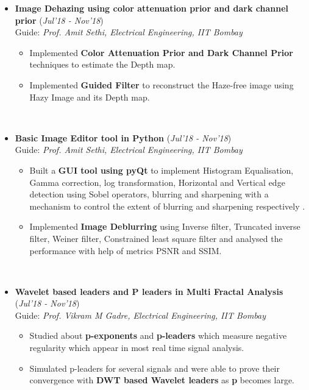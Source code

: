 \documentclass[10pt]{article}
\begin{document}
\begin{itemize}[leftmargin=0.4cm]
	\vspace{-0.25cm}	
	


\item \textbf{Image Dehazing using color attenuation prior and dark channel prior 
} \hfill{(\textit{Jul'18 - Nov'18})}\\
Guide: \textit{Prof. Amit Sethi, Electrical Engineering, IIT Bombay}\\\vspace{-0.68cm}
	\begin{itemize}
	\item Implemented \textbf{Color Attenuation Prior and Dark Channel Prior} techniques to estimate the Depth map.\vspace{-0.1cm}
	\item Implemented \textbf{Guided Filter} to reconstruct the Haze-free image using Hazy Image and its Depth map.\vspace{-0.1cm}
	\end{itemize}\
\vspace{-0.75cm}	

\item \textbf{Basic Image Editor tool in Python 
} 
\hfill{(\textit{Jul'18 - Nov'18})}\\
Guide: \textit{Prof. Amit Sethi, Electrical Engineering, IIT Bombay}\\\vspace{-0.68cm}
	\begin{itemize}
	\item Built a \textbf{GUI tool using pyQt} to implement Histogram Equalisation, Gamma correction, log transformation, Horizontal and Vertical edge detection using Sobel operators, blurring and sharpening with a mechanism to control the extent of blurring and sharpening respectively .\vspace{-0.1cm}
	\item Implemented \textbf{Image Deblurring} using Inverse filter, Truncated inverse filter, Weiner filter, Constrained least square filter and analysed the performance with help of metrics PSNR and SSIM.\vspace{-0.1cm}
	\end{itemize}\
\vspace{-0.75cm}

\item \textbf{Wavelet based leaders and P leaders in Multi
Fractal Analysis} 
\hfill{(\textit{Jul'18 - Nov'18})}\\
Guide: \textit{Prof. Vikram M Gadre, Electrical Engineering, IIT Bombay}\\\vspace{-0.68cm}
	\begin{itemize}
	\item Studied about \textbf{p-exponents} and \textbf{p-leaders} which measure negative regularity which appear in most real time signal analysis.\vspace{-0.1cm}
	\item Simulated p-leaders for several signals and were able to prove their convergence with \textbf{DWT based Wavelet leaders} as \textbf{p} becomes large.
\vspace{-0.1cm}


\end{itemize}
\end{itemize}
\end{document}
